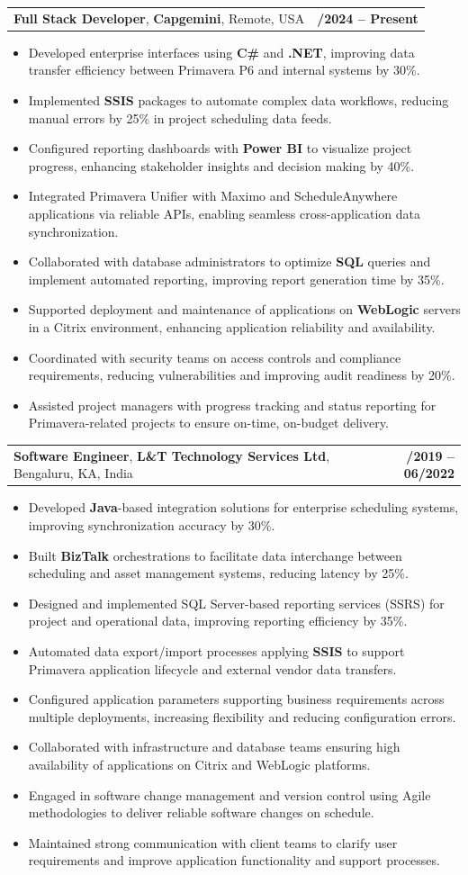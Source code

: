 \documentclass[letterpaper,11pt]{article}
\makeatletter
\newcommand{\resumeItem}[1]{
  \item\footnotesize{
    {#1 \vspace{-2pt}}
  }
}
\newcommand{\resumeSubheading}[4]{
  \vspace{-2pt}\item
    \begin{tabular*}{1.0\textwidth}[t]{l@{\extracolsep{\fill}}r}
      \textbf{\fontsize{10pt}{14pt}\selectfont #3}, \textbf{\fontsize{10pt}{14pt}\selectfont #1}, \fontsize{10pt}{14pt}\selectfont #4 & \textbf{\fontsize{10pt}{14pt}\selectfont #2} \\
    \end{tabular*}\vspace{-7pt}
}
\newcommand{\resumeItemListStart}{\begin{itemize}[leftmargin=*]}
\newcommand{\resumeItemListEnd}{\end{itemize}\vspace{-5pt}}
\makeatother
\begin{document}
    \resumeSubheading
        {Capgemini}{01/2024 -- Present}
        {Full Stack Developer}{Remote, USA}
      \resumeItemListStart
        \resumeItem{Developed enterprise interfaces using \textbf{C\#} and \textbf{.NET}, improving data transfer efficiency between Primavera P6 and internal systems by 30\%.}
        \resumeItem{Implemented \textbf{SSIS} packages to automate complex data workflows, reducing manual errors by 25\% in project scheduling data feeds.}
        \resumeItem{Configured reporting dashboards with \textbf{Power BI} to visualize project progress, enhancing stakeholder insights and decision making by 40\%.}
        \resumeItem{Integrated Primavera Unifier with Maximo and ScheduleAnywhere applications via reliable APIs, enabling seamless cross-application data synchronization.}
        \resumeItem{Collaborated with database administrators to optimize \textbf{SQL} queries and implement automated reporting, improving report generation time by 35\%.}
        \resumeItem{Supported deployment and maintenance of applications on \textbf{WebLogic} servers in a Citrix environment, enhancing application reliability and availability.}
        \resumeItem{Coordinated with security teams on access controls and compliance requirements, reducing vulnerabilities and improving audit readiness by 20\%.}
        \resumeItem{Assisted project managers with progress tracking and status reporting for Primavera-related projects to ensure on-time, on-budget delivery.}
      \resumeItemListEnd

    \resumeSubheading
        {L\&T Technology Services Ltd}{08/2019 -- 06/2022}
        {Software Engineer}{Bengaluru, KA, India}
      \resumeItemListStart
        \resumeItem{Developed \textbf{Java}-based integration solutions for enterprise scheduling systems, improving synchronization accuracy by 30\%.}
        \resumeItem{Built \textbf{BizTalk} orchestrations to facilitate data interchange between scheduling and asset management systems, reducing latency by 25\%.}
        \resumeItem{Designed and implemented SQL Server-based reporting services (SSRS) for project and operational data, improving reporting efficiency by 35\%.}
        \resumeItem{Automated data export/import processes applying \textbf{SSIS} to support Primavera application lifecycle and external vendor data transfers.}
        \resumeItem{Configured application parameters supporting business requirements across multiple deployments, increasing flexibility and reducing configuration errors.}
        \resumeItem{Collaborated with infrastructure and database teams ensuring high availability of applications on Citrix and WebLogic platforms.}
        \resumeItem{Engaged in software change management and version control using Agile methodologies to deliver reliable software changes on schedule.}
        \resumeItem{Maintained strong communication with client teams to clarify user requirements and improve application functionality and support processes.}
      \resumeItemListEnd
\end{document}
